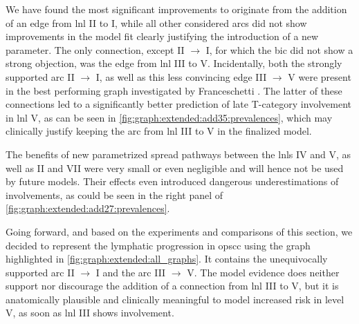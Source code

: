 \documentclass[\relativeRoot/main.tex]{subfiles}
\begin{document}
We have found the most significant improvements to originate from the addition of an edge from \gls{lnl} II to I, while all other considered arcs did not show improvements in the model fit clearly justifying the introduction of a new parameter. The only connection, except II $\rightarrow$ I, for which the \gls{bic} did not show a strong objection, was the edge from \gls{lnl} III to V. Incidentally, both the strongly supported arc II $\rightarrow$ I, as well as this less convincing edge III $\rightarrow$ V were present in the best performing graph investigated by Franceschetti \cite{franceschetti_comparison_2022}. The latter of these connections led to a significantly better prediction of late T-category involvement in \gls{lnl} V, as can be seen in \cref{fig:graph:extended:add35:prevalences}, which may clinically justify keeping the arc from \gls{lnl} III to V in the finalized model.

The benefits of new parametrized spread pathways between the \glspl{lnl} IV and V, as well as II and VII were very small or even negligible and will hence not be used by future models. Their effects even introduced dangerous underestimations of involvements, as could be seen in the right panel of \cref{fig:graph:extended:add27:prevalences}.

Going forward, and based on the experiments and comparisons of this section, we decided to represent the lymphatic progression in \acrlong{opscc} using the graph highlighted in \cref{fig:graph:extended:all_graphs}. It contains the unequivocally supported arc II $\rightarrow$ I and the arc III $\rightarrow$ V. The model evidence does neither support nor discourage the addition of a connection from \gls{lnl} III to V, but it is anatomically plausible and clinically meaningful to model increased risk in level V, as soon as \gls{lnl} III shows involvement.
\end{document}
